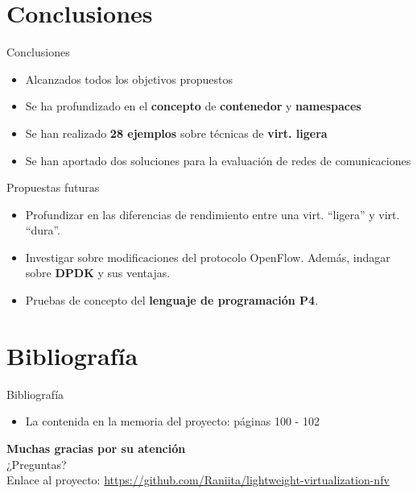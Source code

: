 \documentclass[aspectratio=169,xcolor=dvipsnames]{beamer}
\begin{document}
	
	\section{Conclusiones}
	
	\begin{frame}{Conclusiones}
		\begin{itemize}
		    \item Alcanzados todos los objetivos propuestos
		    \item Se ha profundizado en el \textbf{concepto} de \textbf{contenedor} y \textbf{namespaces}
		    \item Se han realizado \textbf{28 ejemplos} sobre técnicas de \textbf{virt. ligera}
		    \item Se han aportado dos soluciones para la evaluación de redes de comunicaciones
		\end{itemize}
		
		\begin{exampleblock}{Propuestas futuras}
		    \begin{itemize}
		        \item Profundizar en las diferencias de rendimiento entre una virt. ``ligera'' y virt. ``dura''.
		        \item Investigar sobre modificaciones del protocolo OpenFlow. Además, indagar sobre \textbf{DPDK} y sus ventajas.
		        \item Pruebas de concepto del \textbf{lenguaje de programación P4}.
		    \end{itemize}
		\end{exampleblock}
	\end{frame}

	
	\section{Bibliografía}
	
	\begin{frame}{Bibliografía}
		\begin{itemize}
		    \item La contenida en la memoria del proyecto: páginas 100 - 102
		\end{itemize}
	\end{frame}
	
	\begin{frame}
	    \begin{center}
	        \vspace{30px}
	        \Large \textbf{Muchas gracias por su atención} \\
	        \vspace{30px}
	        \large ¿Preguntas? \\
	        \vspace{60px}
	        Enlace al proyecto: \small \url{https://github.com/Raniita/lightweight-virtualization-nfv}
	    \end{center}
	\end{frame}
	
\end{document}
